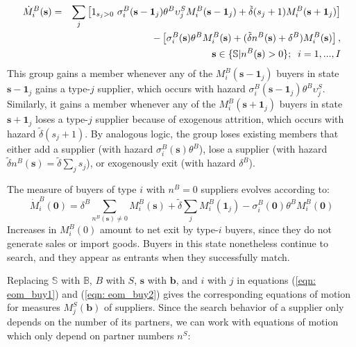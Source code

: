 \documentclass[12pt]{article} \usepackage{amsmath,amssymb,amsthm,geometry,graphicx,setspace,algorithm,algpseudocode,float}
\begin{document}
\begin{eqnarray}
\label{eqn: eom_buy1}
\dot{M}_{i}^{B}(\mathbf{s}) &=&\sum_{j}\left[  1_{s_j>0} \ \sigma_{i}^{B}(\mathbf{s}%
-\mathbf{1}_{j})\theta ^{B}\upsilon_{j}^{S}M_{i}^{B}(\mathbf{s}-\mathbf{1}_{j})+\tilde{\delta} (s_{j}+1)M_{i}^{B}(\mathbf{s}+\mathbf{1}_{j})\right]\\
&&-\left[ \sigma_{i}^{B}(\mathbf{s})\theta ^{B}M_{i}^{B}(\mathbf{s})+(\tilde{\delta} n^{B}(\mathbf{s})+\delta^B)M_{i}^{B}(\mathbf{s})\right] , \notag \\
&& \qquad\qquad\qquad\qquad\qquad\qquad\qquad \mathbf{s} \in \{ \mathbb{S}| n^B(\mathbf{s})>0 \};  \;\;i=1,...,I \notag 
\end{eqnarray}
This group gains a member whenever any of the $M_{i}^{B}(\mathbf{s}-\mathbf{1}_{j})$ buyers in state $\mathbf{s}-\mathbf{1}_{j}$ gains a type-$j$ supplier, which occurs with hazard $\sigma_{i}^{B}(\mathbf{s}-\mathbf{1}_{j})\theta ^{B}\upsilon
_{j}^{S}.$ Similarly, it gains a member whenever any of the $M_{i}^{B}(\mathbf{s}+\mathbf{1}_{j})$ buyers in state $\mathbf{s}+\mathbf{1}_{j}$
loses a type-$j$ supplier because of exogenous attrition, which occurs
with hazard $\tilde{\delta} (s_{j}+1).$ By analogous logic, the group loses existing members that either add a supplier (with hazard $\sigma
_{i}^{B}(\mathbf{s})\theta ^{B}$), lose a supplier (with hazard $\tilde{\delta} n^{B}(\mathbf{s})=\tilde{\delta}\sum_{j}s_{j}$), or exogenously exit (with hazard $\delta^B$). 
\par
The measure of buyers of type $i$ with $n^B=0$ suppliers evolves according to:%
\begin{equation}
\dot{M}_{i}^{B}(\mathbf{0})=\delta^B\sum_{n^B(\mathbf{s})\neq 0}M_i^B(\mathbf{s})+\tilde{\delta} \sum_{j}M_{i}^{B}(\mathbf{1}_{j})-\sigma_{i}^{B}(\mathbf{0})\theta ^{B}M_{i}^{B}(\mathbf{0})
\label{eqn: eom_buy2}
\end{equation}
Increases in $M_i^B(0)$ amount to net exit by type-$i$ buyers, since they do not generate sales or import goods. Buyers in this state nonetheless continue to search, and they appear as entrants when they successfully match.
\par
Replacing $\mathbb{S}$ with $\mathbb{B}$, $B$ with $S$, $\mathbf{s}$ with $\mathbf{b}$, and $i$ with $j$ in equations (\ref{eqn: eom_buy1}) and (\ref{eqn: eom_buy2}) gives the corresponding equations of motion for measures $M_{j}^{S}(\mathbf{b})$ of suppliers. Since the search behavior of a supplier only depends on the number of its partners, we can work with equations of motion which only depend on partner numbers $n^S$: 
\end{document}
